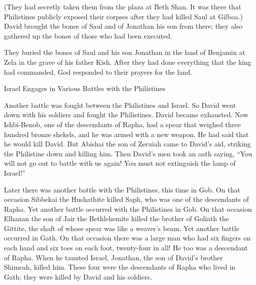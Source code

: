 {(They had secretly taken
them from the
plaza
at Beth Shan.
It was there
that Philistines
publicly exposed
their corpses
after
they
had killed
Saul
at Gilboa.)
David brought
the bones
of Saul
and of Jonathan
his son
from there;
they also gathered up
the bones
of those who had been executed.
\par }{\PP {}They buried
the
bones
of Saul
and his son
Jonathan
in the land
of Benjamin
at Zela
in the grave
of his father
Kish.
After they had done
everything
that
the king
had commanded,
God
responded to their prayers
for the land.
\par }{\SH Israel Engages in Various Battles with the Philistines
\par }{\PP {}Another
battle
was fought between the Philistines
and Israel.
So David
went down
with
his soldiers
and fought
the Philistines.
David
became exhausted.
Now Ishbi-Benob,
one of the descendants
of Rapha,
had a spear
that weighed
three
hundred
bronze
shekels,
and he
was armed
with a new
weapon. He had said
that he would kill
David.
But Abishai
the son
of Zeruiah
came to David’s aid, striking
the Philistine
down and killing him.
Then
David’s
men
took an oath
saying,
“You will not
go out
to battle
with
us again! You must not
extinguish
the lamp
of Israel!”
\par }{\PP {}Later
there was
another
battle
with
the Philistines,
this time
in Gob.
On that occasion
Sibbekai
the Hushathite
killed Saph,
who was one of the descendants
of Rapha.
Yet another
battle
occurred
with
the Philistines
in Gob.
On that occasion Elhanan
the son
of Jair
the Bethlehemite
killed
the brother of Goliath
the Gittite,
the shaft
of whose spear
was like a weaver’s
beam.
Yet another
battle
occurred in Gath.
On that occasion
there was
a large man
who had six
fingers
on each hand
and six
toes
on each foot,
twenty-four
in all! He too
was a descendant
of Rapha.
When he taunted
Israel,
Jonathan,
the son
of David’s
brother
Shimeah,
killed him.
These
four
were the descendants of Rapha
who lived in Gath;
they were killed
by
David
and his soldiers.

\par }
